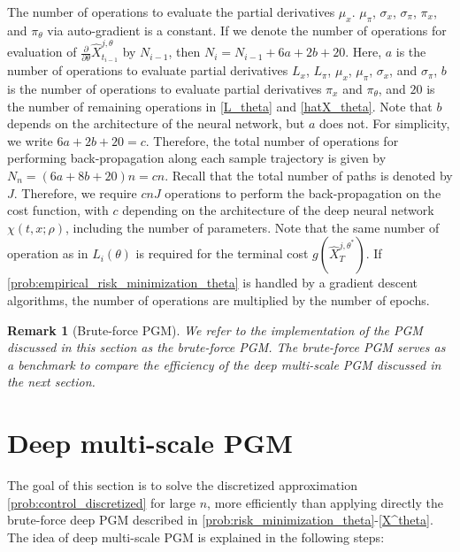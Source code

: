 \documentclass{article}
\newtheorem{remark}{Remark}[section]
\numberwithin{equation}{section}
\begin{document}
The number of operations to evaluate the partial derivatives $\mu_x$. $\mu_\pi$, $\sigma_x$, $\sigma_\pi$, $\pi_x$, and $\pi_\theta$ via auto-gradient is a constant. If we denote the number of operations for evaluation of $\frac{\partial}{\partial\theta}\hat{X}^{j,\theta}_{t_{i-1}}$ by $N_{i-1}$, then $N_i=N_{i-1}+6a  + 2b+ 20$. Here, $a$ is the number of  operations to evaluate partial derivatives  $L_x$, $L_{\pi}$, $\mu_x$, $\mu_{\pi}$, $\sigma_x$, and $\sigma_{\pi}$, $b$ is the number of operations to evaluate partial derivatives $\pi_x$ and $\pi_\theta$, and $20$ is the number of remaining operations in \eqref{L_theta} and \eqref{hatX_theta}. Note that $b$ depends on the architecture of the neural network, but $a$ does not. For simplicity, we write $6a+2b+20=c$. Therefore, the total number of operations for performing back-propagation along each sample trajectory is given by $N_n=(6a  + 8b+ 20)n=cn$. Recall that the total number of paths is denoted by $J$. Therefore, we require $cnJ$ operations to perform the back-propagation on the cost function, with $c$ depending on the architecture of the deep neural network $\chi(t,x;\rho)$, including the number of parameters. Note that the same number of operation as in $L_i(\theta)$ is required for the terminal cost $g(\hat{X}_T^{j,\theta^{*}})$.  If  \eqref{prob:empirical_risk_minimization_theta} is handled by a gradient descent algorithms, the number of operations are multiplied by the number of epochs.
\begin{remark}[Brute-force PGM]
    We refer to the implementation of the PGM discussed in this section as the brute-force PGM. The brute-force PGM serves as a benchmark to compare the efficiency of the deep multi-scale PGM discussed in the next section.
\end{remark}
\section{Deep multi-scale PGM}
 \label{sec:main}
The goal of this section is to solve the discretized approximation \eqref{prob:control_discretized} for large $n$, more efficiently than applying directly the brute-force deep PGM described in \eqref{prob:risk_minimization_theta}-\eqref{X^theta}. The idea of deep multi-scale PGM is explained in the following steps:
\end{document}
